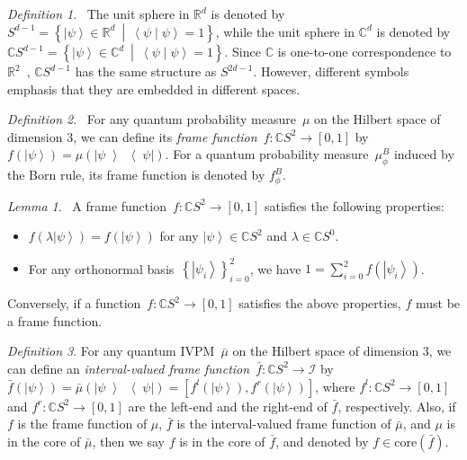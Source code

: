 \documentclass[12pt]{iopart}
\theoremstyle{remark}
\newtheorem{definition}{Definition}
\newtheorem{lemma}{Lemma}
\newcommand{\ket}[1]{{\left\vert{#1}\right\rangle}}
\newcommand{\op}[2]{\ensuremath{\left\vert{#1}\middle\rangle\middle\langle{#2}\right\vert}}
\newcommand{\proj}[1]{\op{#1}{#1}}
\newcommand{\ip}[2]{\ensuremath{\left\langle{#1}\middle\vert{#2}\right\rangle}}
\newcommand{\set}[2]{\ensuremath{\left\{ {#1}~\middle|~{#2}\right\} }}
\begin{document}
\begin{definition}\cite{Hatcher2001,dryden2005}~The unit sphere
in $\mathbb{R}^{d}$ is denoted by $S^{d-1}=\set{\ket{\psi}\in\mathbb{R}^{d}}{\ip{\psi}{\psi}=1}$,
while the unit sphere in $\mathbb{C}^{d}$ is denoted by $\mathbb{C}S^{d-1}=\set{\ket{\psi}\in\mathbb{C}^{d}}{\ip{\psi}{\psi}=1}$.
Since $\mathbb{C}$ is one-to-one correspondence to $\mathbb{R}^{2}$~\cite{GAMELIN2003},
$\mathbb{C}S^{d-1}$ has the same structure as $S^{2d-1}$. However,
different symbols emphasis that they are embedded in different spaces.\end{definition}

\begin{definition}\cite{gleason1957,peres1995quantum,RichmanBridges1999}~For
any quantum probability measure~$\mu$ on the Hilbert space of dimension
3, we can define its \emph{frame function}~$f:\mathbb{C}S^{2}\rightarrow\left[0,1\right]$
by $f\left(\ket{\psi}\right)=\mu\left(\proj{\psi}\right)$. For a
quantum probability measure~$\mu_{\phi}^{B}$ induced by the Born
rule, its frame function is denoted by $f_{\phi}^{B}$.\end{definition}

\begin{lemma}\cite{gleason1957,peres1995quantum,RichmanBridges1999}~A
frame function~$f:\mathbb{C}S^{2}\rightarrow\left[0,1\right]$ satisfies
the following properties:
\begin{itemize}
\item $f\left(\lambda\ket{\psi}\right)=f\left(\ket{\psi}\right)$ for any
$\ket{\psi}\in\mathbb{C}S^{2}$ and $\lambda\in\mathbb{C}S^{0}$.
\item For any orthonormal basis~$\left\{ \ket{\psi_{i}}\right\} _{i=0}^{2}$,
we have $1=\sum_{i=0}^{2}f\left(\ket{\psi_{i}}\right)$.
\end{itemize}
Conversely, if a function~$f:\mathbb{C}S^{2}\rightarrow\left[0,1\right]$
satisfies the above properties, $f$ must be a frame function.\end{lemma}

\begin{definition}For any quantum IVPM~$\bar{\mu}$ on the Hilbert
space of dimension 3, we can define an \emph{interval-valued frame
function}~$\bar{f}:\mathbb{C}S^{2}\rightarrow\mathscr{I}$ by $\bar{f}\left(\ket{\psi}\right)=\bar{\mu}\left(\proj{\psi}\right)=\left[f^{l}\left(\ket{\psi}\right),f^{r}\left(\ket{\psi}\right)\right]$,
where $f^{l}:\mathbb{C}S^{2}\rightarrow\left[0,1\right]$ and $f^{r}:\mathbb{C}S^{2}\rightarrow\left[0,1\right]$
are the left-end and the right-end of $\bar{f}$, respectively. Also,
if $f$ is the frame function of $\mu$, $\bar{f}$ is the interval-valued
frame function of $\bar{\mu}$, and $\mu$ is in the core of $\bar{\mu}$,
then we say $f$ is in the core of $\bar{f}$, and denoted by $f\in\mathrm{core}\left(\bar{f}\right)$.\end{definition}
\end{document}
